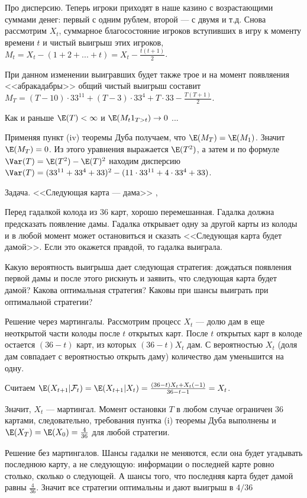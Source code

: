 Про дисперсию. Теперь игроки приходят в наше казино с возрастающими суммами денег: первый с одним рублем, второй --- с двумя и т.д. Снова рассмотрим $X_{t}$, суммарное благосостояние игроков вступивших в игру к моменту времени $t$ и чистый выигрыш этих игроков, $M_{t}=X_{t}-(1+2+...+t)=X_{t}-\frac{t(t+1)}{2}$.

При данном изменении выигравших будет также трое и на момент появляения <<абракадабры>> общий чистый выигрыш составит $M_{T}=(T-10)\cdot 33^{11}+(T-3)\cdot 33^{4}+T\cdot 33-\frac{T(T+1)}{2}$.

Как и раньше $\E(T)<\infty$ и $\E(M_{t}1_{T>t})\to 0$ ...

Применяя пункт (iv) теоремы Дуба получаем, что $\E(M_{T})=\E(M_{1})$. Значит $\E(M_{T})=0$. Из этого уравнения выражается $\E(T^{2})$, а затем и по формуле $\Var(T)=\E(T^{2})-\E(T)^{2}$ находим дисперсию $\Var(T)=(33^{11}+33^{4}+33)^{2}-(11\cdot 33^{11}+4\cdot 33^{4}+ 33)$.


Задача. <<Следующая карта --- дама>> \cite{morters:m}, \cite{winkler:gpdp}

Перед гадалкой колода из 36 карт, хорошо перемешанная. Гадалка
должна предсказать появление дамы. Гадалка открывает
одну за другой карты из колоды и в любой момент может остановиться
и сказать <<Следующая карта будет дамой>>. Если это окажется правдой, то гадалка выиграла. 

Какую вероятность выигрыша дает следующая стратегия: дождаться появления первой дамы и после этого рискнуть и заявить, что следующая карта будет дамой? Какова оптимальная стратегия? Каковы при шансы выиграть при оптимальной стратегии?

Решение через мартингалы. Рассмотрим процесс $X_{t}$ --- долю дам в еще неоткрытой части колоды после $t$ открытых карт. После $t$ открытых карт в колоде остается $(36-t)$ карт, из которых $(36-t)X_{t}$ дам. С вероятностью $X_{t}$ (доля дам совпадает с вероятностью открыть даму) количество дам уменьшится на одну.

Считаем $\E(X_{t+1}|\mathcal{F}_{t})=\E(X_{t+1}|X_{t})=\frac{(36-t)X_{t}+X_{t}(-1)}{36-t-1}=X_{t}$.

Значит, $X_{t}$ --- мартингал. Момент остановки $T$ в любом случае ограничен 36 картами, следовательно, требования пунтка (i) теоремы Дуба выполнены и $\E(X_{T})=\E(X_{0})=\frac{4}{36}$ для любой стратегии.

Решение без мартингалов. Шансы гадалки не меняются, если она будет угадывать последнюю карту, а не следующую: информации о последней карте ровно столько, сколько о следующей. А шансы того, что последняя карта будет дамой равны $\frac{4}{36}$.
Значит все стратегии оптимальны и дают выигрыш в $4/36$

